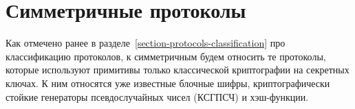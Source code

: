 \section{Симметричные протоколы}

Как отмечено ранее в разделе~\ref{section-protocols-classification} про классификацию протоколов, к симметричным будем относить те протоколы, которые используют примитивы только классической криптографии на секретных ключах. К ним относятся уже известные блочные шифры, криптографически стойкие генераторы псевдослучайных чисел (КСГПСЧ) и хэш-функции.







